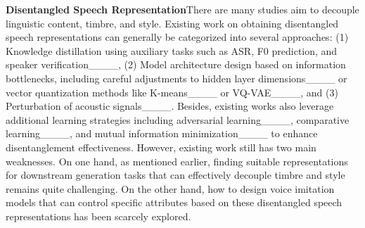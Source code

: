 \textbf{Disentangled Speech Representation}\quad There are many studies aim to decouple linguistic content, timbre, and style. Existing work on obtaining disentangled speech representations can generally be categorized into several approaches: (1) Knowledge distillation using auxiliary tasks such as ASR, F0 prediction, and speaker verification____, (2) Model architecture design based on information bottlenecks, including careful adjustments to hidden layer dimensions____ or vector quantization methods like K-means____ or VQ-VAE____, and (3) Perturbation of acoustic signals____. Besides, existing works also leverage additional learning strategies including adversarial learning____, comparative learning____, and mutual information minimization____ to enhance disentanglement effectiveness. However, existing work still has two main weaknesses. On one hand, as mentioned earlier, finding suitable representations for downstream generation tasks that can effectively decouple timbre and style remains quite challenging. On the other hand, how to design voice imitation models that can control specific attributes based on these disentangled speech representations has been scarcely explored.